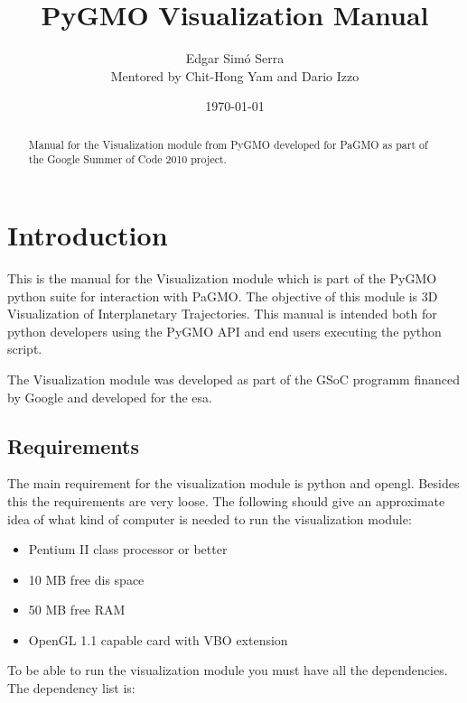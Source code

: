 \documentclass[a4paper,11pt]{article}
\title{PyGMO Visualization Manual}
\author{
      Edgar Sim\'{o} Serra \\
      Mentored by Chit-Hong Yam and Dario Izzo 
}
\date{\today}
\begin{document}


\begin{abstract}
Manual for the Visualization module from PyGMO developed for PaGMO as part of the Google Summer of Code 2010 project.
\end{abstract}


\tableofcontents
\newpage

\lstset{ breaklines=true,
         numbers=left,
         numberstyle=\tiny }


\section{Introduction}

This is the manual for the Visualization module which is part of the \gls{PyGMO} python suite for interaction with \gls{PaGMO}\cite{pagmo}. The objective of this module is 3D Visualization of Interplanetary Trajectories. This manual is intended both for python developers using the PyGMO \gls{API} and end users executing the python script.

The Visualization module was developed as part of the \gls{GSoC} programm financed by Google and developed for the \gls{esa}.


\subsection{Requirements}

The main requirement for the visualization module is \gls{python} and \gls{opengl}. Besides this the requirements are very loose. The following should give an approximate idea of what kind of computer is needed to run the visualization module:

\begin{itemize}
\item Pentium II class processor or better
\item 10 MB free dis space
\item 50 MB free RAM
\item OpenGL 1.1 capable card with VBO extension
\end{itemize}

To be able to run the visualization module you must have all the dependencies. The dependency list is:\label{lbl:deps}
\end{document}
